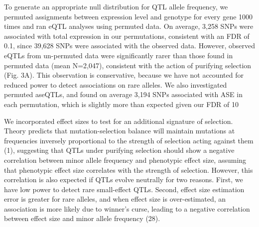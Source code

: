 To generate an appropriate null distribution for QTL allele frequency, we permuted assignments between expression level and genotype for every gene 1000 times and ran eQTL analyses using permuted data. On average, 3,258 SNPs were associated with total expression in our permutations, consistent with an FDR of 0.1, since 39,628 SNPs were associated with the observed data. However, observed eQTLs from un-permuted data were significantly rarer than those found in permuted data (mean N=2,047), consistent with the action of purifying selection (Fig. 3A). This observation is conservative, because we have not accounted for reduced power to detect associations on rare alleles. We also investigated permuted aseQTLs, and found on average 3,194 SNPs associated with ASE in each permutation, which is slightly more than expected given our FDR of 10%

We incorporated effect sizes to test for an additional signature of selection. Theory predicts that mutation-selection balance will maintain mutations at frequencies inversely proportional to the strength of selection acting against them (1), suggesting that QTLs under purifying selection should show a negative correlation between minor allele frequency and phenotypic effect size, assuming that phenotypic effect size correlates with the strength of selection. However, this correlation is also expected if QTLs evolve neutrally for two reasons. First, we have low power to detect rare small-effect QTLs. Second, effect size estimation error is greater for rare alleles, and when effect size is over-estimated, an association is more likely due to winner’s curse, leading to a negative correlation between effect size and minor allele frequency (28). 

